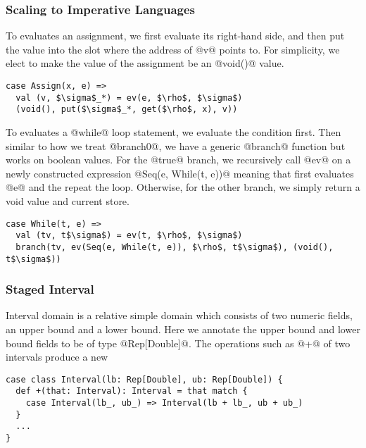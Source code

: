 \subsubsection{Scaling to Imperative Languages}

To evaluates an assignment, we first evaluate its right-hand side, and then put
the value into the slot where the address of @v@ points to. For simplicity, we
elect to make the value of the assignment be an @void()@ value.

\begin{lstlisting}
case Assign(x, e) =>
  val (v, $\sigma$_*) = ev(e, $\rho$, $\sigma$)
  (void(), put($\sigma$_*, get($\rho$, x), v))
\end{lstlisting}

To evaluates a @while@ loop statement, we evaluate the condition first. Then
similar to how we treat @branch0@, we have a generic @branch@ function but works
on boolean values. For the @true@ branch, we recursively call @ev@ on a newly
constructed expression @Seq(e, While(t, e))@ meaning that first evaluates @e@
and the repeat the loop. Otherwise, for the other branch, we simply return a
void value and current store.

\begin{lstlisting}
case While(t, e) =>
  val (tv, t$\sigma$) = ev(t, $\rho$, $\sigma$)
  branch(tv, ev(Seq(e, While(t, e)), $\rho$, t$\sigma$), (void(), t$\sigma$))
\end{lstlisting}

\subsubsection{Staged Interval}

Interval domain is a relative simple domain which consists of two numeric
fields, an upper bound and a lower bound. Here we annotate the upper bound and
lower bound fields to be of type @Rep[Double]@. The operations such as @+@ of
two intervals produce a new

\begin{lstlisting}
case class Interval(lb: Rep[Double], ub: Rep[Double]) {
  def +(that: Interval): Interval = that match {
    case Interval(lb_, ub_) => Interval(lb + lb_, ub + ub_)
  }
  ...
}
\end{lstlisting}


